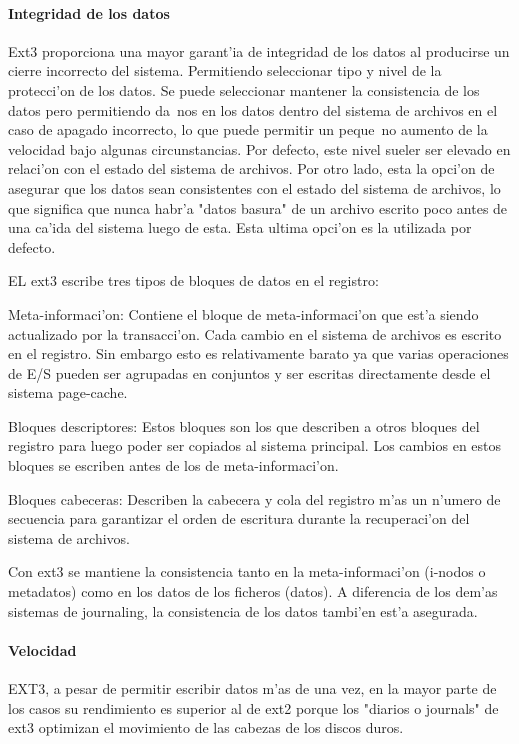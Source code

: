 \paragraph{Integridad de los datos}
Ext3 proporciona una mayor garant'ia de integridad de los datos al producirse un cierre incorrecto del sistema. Permitiendo seleccionar tipo y nivel de la protecci'on de los datos. Se puede seleccionar mantener la consistencia de los datos
pero permitiendo da~nos en los datos dentro del sistema de archivos en el caso de apagado incorrecto, lo que puede permitir un peque~no aumento de la velocidad bajo algunas circunstancias. Por defecto, este nivel sueler ser elevado en relaci'on con el estado del sistema de archivos. Por otro lado, esta la opci'on de asegurar que los datos sean consistentes con el estado del sistema de archivos, lo que significa que nunca habr'a "datos basura" de un archivo escrito poco antes de una ca'ida del sistema luego de esta.
Esta ultima opci'on es la utilizada por defecto.

EL ext3 escribe tres tipos de bloques de datos en el registro:
\begin{asparaenum}
	\item Meta-informaci'on: Contiene el bloque de meta-informaci'on que est'a siendo actualizado por la transacci'on. Cada cambio en el sistema de archivos es escrito en el registro. Sin embargo esto es relativamente barato ya que varias operaciones de E/S pueden ser agrupadas en conjuntos y ser escritas directamente desde el sistema page-cache.
	\item Bloques descriptores: Estos bloques son los que describen a otros bloques del registro para luego poder ser copiados al sistema principal. Los cambios en estos bloques se escriben antes de los de meta-informaci'on.
	\item Bloques cabeceras: Describen la cabecera y cola del registro m'as un n'umero de secuencia para garantizar el orden de escritura durante la recuperaci'on del sistema de archivos.
\end{asparaenum}
Con ext3 se mantiene la consistencia tanto en la meta-informaci'on (i-nodos o metadatos) como en los datos de los ficheros (datos). A diferencia de los dem'as sistemas de journaling, la consistencia de los datos tambi'en est'a asegurada.
						
\paragraph{Velocidad}
EXT3, a pesar de permitir escribir datos m'as de una vez, en la mayor parte de los casos su rendimiento es superior al de ext2 porque los "diarios o journals" de ext3 optimizan el movimiento de las cabezas de los discos duros.

